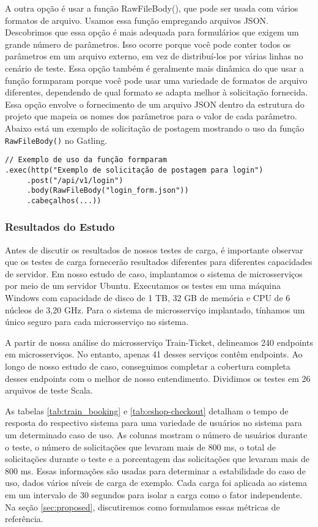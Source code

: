 \begin{tabela}[h]
\begin{tabela}[!t]
A outra opção é usar a função RawFileBody(), que pode ser usada com vários formatos de arquivo. Usamos essa função empregando arquivos JSON. Descobrimos que essa opção é mais adequada para formulários que exigem um grande número de parâmetros. Isso ocorre porque você pode conter todos os parâmetros em um arquivo externo, em vez de distribuí-los por várias linhas no cenário de teste. Essa opção também é geralmente mais dinâmica do que usar a função formparam porque você pode usar uma variedade de formatos de arquivo diferentes, dependendo de qual formato se adapta melhor à solicitação fornecida. Essa opção envolve o fornecimento de um arquivo JSON dentro da estrutura do projeto que mapeia os nomes dos parâmetros para o valor de cada parâmetro. Abaixo está um exemplo de solicitação de postagem mostrando o uso da função \texttt{RawFileBody()} no Gatling.

\begin{lstlisting}
// Exemplo de uso da função formparam
.exec(http("Exemplo de solicitação de postagem para login")
     .post("/api/v1/login")
     .body(RawFileBody("login_form.json"))
     .cabeçalhos(...))
\end{lstlisting}

\subsubsection{Resultados do Estudo}

Antes de discutir os resultados de nossos testes de carga, é importante observar que os testes de carga fornecerão resultados diferentes para diferentes capacidades de servidor. Em nosso estudo de caso, implantamos o sistema de microsserviços por meio de um servidor Ubuntu. Executamos os testes em uma máquina Windows com capacidade de disco de 1 TB, 32 GB de memória e CPU de 6 núcleos de 3,20 GHz. Para o sistema de microsserviço implantado, tínhamos um único seguro para cada microsserviço no sistema.

A partir de nossa análise do microsserviço Train-Ticket, delineamos 240 endpoints em microsserviços. No entanto, apenas 41 desses serviços contêm endpoints. Ao longo de nosso estudo de caso, conseguimos completar a cobertura completa desses endpoints com o melhor de nosso entendimento. Dividimos os testes em 26 arquivos de teste Scala.

As tabelas \ref{tab:train_booking} e \ref{tab:eshop-checkout} detalham o tempo de resposta do respectivo sistema para uma variedade de usuários no sistema para um determinado caso de uso. As colunas mostram o número de usuários durante o teste, o número de solicitações que levaram mais de 800 ms, o total de solicitações durante o teste e a porcentagem das solicitações que levaram mais de 800 ms. Essas informações são usadas para determinar a estabilidade do caso de uso, dados vários níveis de carga de exemplo. Cada carga foi aplicada ao sistema em um intervalo de 30 segundos para isolar a carga como o fator independente. Na seção \ref{sec:proposed}, discutiremos como formulamos essas métricas de referência.


\end{tabela}
\end{tabela}

